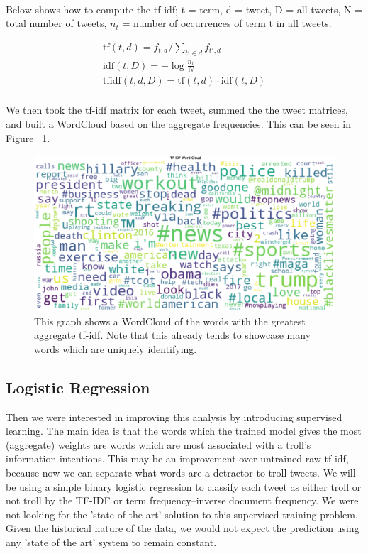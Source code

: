 \documentclass[runningheads]{llncs}
\begin{document}
~\\

Below shows how to compute the tf-idf; t = term, d = tweet, D = all tweets, N = total number of tweets, $n_t$ = number of occurrences of term t in all tweets.

\begin{align*}
\mathrm{tf}(t,d) = f_{t,d} \Bigg/ {\sum_{t' \in d}{f_{t',d}}} \\
\mathrm{idf}(t, D) = - \log \frac {n_t} {N} \\
\mathrm{tfidf}(t,d,D) = \mathrm{tf}(t,d) \cdot \mathrm{idf}(t, D)\\
\end{align*}

We then took the tf-idf matrix for each tweet, summed the the tweet matrices, and built a WordCloud based on the aggregate frequencies. This can be seen in Figure ~\ref{pre_cloud.eps}. 

\begin{figure}
\includegraphics[width=\textwidth]{pre_cloud.eps}
\caption{This graph shows a WordCloud of the words with the greatest aggregate tf-idf. Note that this already tends to showcase many words which are uniquely identifying.} \label{pre_cloud.eps}
\end{figure}

\subsection{Logistic Regression}

Then we were interested in improving this analysis by introducing supervised learning. The main idea is that the words which the trained model gives the most (aggregate) weights are words which are most associated with a troll's information intentions. This may be an improvement over untrained raw tf-idf, because now we can separate what words are a detractor to troll tweets.
We will be using a simple binary logistic regression to classify each tweet as either troll or not troll by the TF-IDF or term frequency–inverse document frequency. We were not looking for the 'state of the art' solution to this supervised training problem. Given the historical nature of the data, we would not expect the prediction using any 'state of the art' system to remain constant.
\newline
\end{document}
